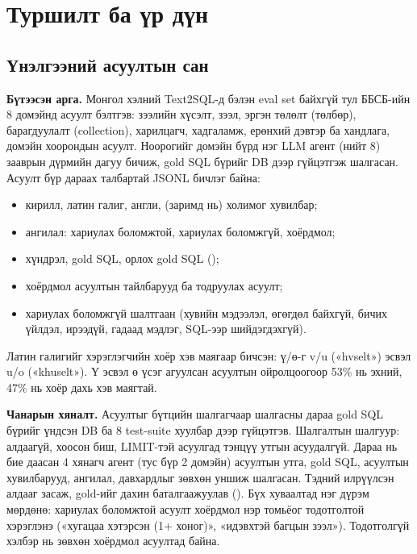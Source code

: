 
\chapter{Туршилт ба үр дүн}
\label{Chapter3}
\pagecolor{white}

\section{Үнэлгээний асуултын сан}
\label{sec:evalset}

\textbf{Бүтээсэн арга.} Монгол хэлний Text2SQL-д бэлэн eval set байхгүй тул ББСБ-ийн 8 домэйнд асуулт бэлтгэв:
зээлийн хүсэлт, зээл, эргэн төлөлт (төлбөр), барагдуулалт (collection), харилцагч, хадгаламж, ерөнхий дэвтэр ба
хандлага, домэйн хоорондын асуулт. Ноорогийг домэйн бүрд нэг LLM агент (нийт 8) зааврын дүрмийн дагуу бичиж, gold SQL бүрийг DB дээр гүйцэтгэж
шалгасан. Асуулт бүр дараах талбартай JSONL бичлэг байна:
\begin{itemize}
  \item кирилл, латин галиг, англи, (заримд нь) холимог хувилбар;
  \item ангилал: хариулах боломжтой, хариулах боломжгүй, хоёрдмол;
  \item хүндрэл, gold SQL, орлох gold SQL ();
  \item хоёрдмол асуултын тайлбарууд ба тодруулах асуулт;
  \item хариулах боломжгүй шалтгаан (хувийн мэдээлэл, өгөгдөл байхгүй, бичих үйлдэл, ирээдүй, гадаад мэдлэг,
        SQL-ээр шийдэгдэхгүй).
\end{itemize}
Латин галигийг хэрэглэгчийн хоёр хэв маягаар бичсэн: ү/ө-г v/u («hvselt») эсвэл u/o («khuselt»). Ү эсвэл ө үсэг агуулсан
асуултын ойролцоогоор 53\% нь эхний, 47\% нь хоёр дахь хэв маягтай.

\textbf{Чанарын хяналт.} Асуултыг бүтцийн шалгагчаар шалгасны дараа gold SQL бүрийг үндсэн DB ба 8 test-suite хуулбар
дээр гүйцэтгэв. Шалгалтын шалгуур: алдаагүй, хоосон биш, LIMIT-тэй асуулгад тэнцүү утгын асуудалгүй. Дараа нь бие даасан
4 хянагч агент (тус бүр 2 домэйн) асуултын утга, gold SQL, асуултын хувилбарууд, ангилал, давхардлыг зөвхөн уншиж шалгасан.
Тэдний илрүүлсэн алдааг засаж, gold-ийг дахин баталгаажуулав (). Бүх хуваалтад
нэг дүрэм мөрдөнө: хариулах боломжтой асуулт хоёрдмол нэр томьёог тодотголтой хэрэглэнэ («хугацаа хэтэрсэн
(1+ хоног)», «идэвхтэй багцын зээл»). Тодотголгүй хэлбэр нь зөвхөн хоёрдмол асуултад байна.


